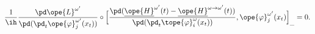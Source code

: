 \begin{equation}	\label{12.95}
\frac{1}{\ih}
\frac{\pd\ope{L}^{\omega'}}{\pd(\pd_t\ope{\varphi}_j^{\omega'}(x_t) )} \circ
\Bigl[
\frac{\pd (\underline{\ope{H}}^{\omega'}(t)
	   - \underline{\ope{H}}^{\omega\to\omega'}(t) )
     }
     {\pd(\pd_t\tope{\varphi}_i^{\omega}(x_t) )}
,
\ope{\varphi}_j^{\omega'}(x_t)
\Bigr]_{\_}
= 0 .
	\end{equation}


